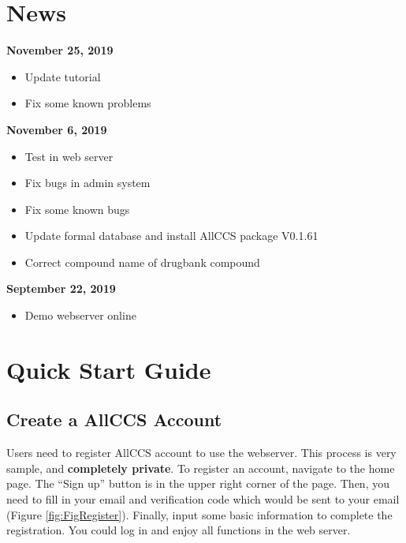 \documentclass[12pt,]{book}
\providecommand{\tightlist}{%
  \setlength{\itemsep}{0pt}\setlength{\parskip}{0pt}}
\begin{document}
\chapter*{News}\label{news}

\textbf{November 25, 2019}

\begin{itemize}
\tightlist
\item
  Update tutorial
\item
  Fix some known problems
\end{itemize}

\textbf{November 6, 2019}

\begin{itemize}
\tightlist
\item
  Test in web server
\item
  Fix bugs in admin system
\item
  Fix some known bugs
\item
  Update formal database and install AllCCS package V0.1.61
\item
  Correct compound name of drugbank compound 
\end{itemize}

\textbf{September 22, 2019}

\begin{itemize}
\tightlist
\item
  Demo webserver online
\end{itemize}

\chapter{Quick Start Guide}\label{chapter1}

\section{Create a AllCCS Account}\label{chaptere1d1}

Users need to register AllCCS account to use the webserver. This process
is very sample, and \textbf{completely private}. To register an account,
navigate to the home page. The ``Sign up'' button is in the upper right
corner of the page. Then, you need to fill in your email and
verification code which would be sent to your email (Figure
\ref{fig:FigRegister}). Finally, input some basic information to
complete the registration. You could log in and enjoy all functions in
the web server.
\end{document}
